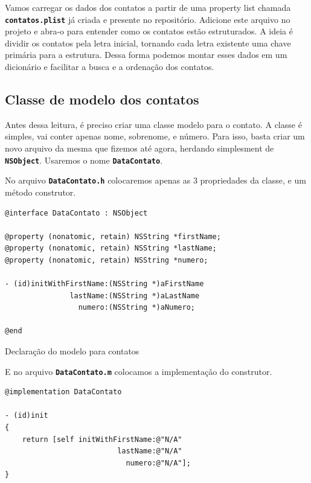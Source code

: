 \documentclass[a4paper,12pt,brazil,doubleside]{book}
\begin{document}
\begin{singlespace}
Vamos carregar os dados dos contatos a partir de uma property list chamada \texttt{\textbf{contatos.plist}} já criada e presente no repositório. Adicione este arquivo no projeto e abra-o para entender como os contatos estão estruturados. A ideia é dividir os contatos pela letra inicial, tornando cada letra existente uma chave primária para a estrutura. Dessa forma podemos montar esses dados em um dicionário e facilitar a busca e a ordenação dos contatos.

\subsection{Classe de modelo dos contatos}


Antes dessa leitura, é preciso criar uma classe modelo para o contato. A classe é simples, vai conter apenas nome, sobrenome, e número. Para isso, basta criar um novo arquivo da mesma que fizemos até agora, herdando simplesment de \texttt{\textbf{NSObject}}. Usaremos o nome \texttt{\textbf{DataContato}}.

No arquivo \texttt{\textbf{DataContato.h}} colocaremos apenas as 3 propriedades da classe, e um método construtor.

\begin{listing}[H]
\begin{verbatim}
@interface DataContato : NSObject

@property (nonatomic, retain) NSString *firstName;
@property (nonatomic, retain) NSString *lastName;
@property (nonatomic, retain) NSString *numero;

- (id)initWithFirstName:(NSString *)aFirstName
               lastName:(NSString *)aLastName
                 numero:(NSString *)aNumero;

@end
\end{verbatim}
\caption{Declaração do modelo para contatos}
\end{listing}


E no arquivo \texttt{\textbf{DataContato.m}} colocamos a implementação do construtor.

\begin{listing}[H]
\begin{verbatim}
@implementation DataContato

- (id)init
{
    return [self initWithFirstName:@"N/A"
                          lastName:@"N/A"
                            numero:@"N/A"];
}


\end{verbatim}
\end{listing}
\end{singlespace}
\end{document}
